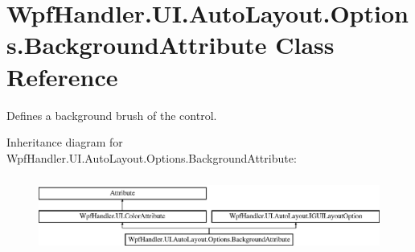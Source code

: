 \hypertarget{class_wpf_handler_1_1_u_i_1_1_auto_layout_1_1_options_1_1_background_attribute}{}\section{Wpf\+Handler.\+U\+I.\+Auto\+Layout.\+Options.\+Background\+Attribute Class Reference}
\label{class_wpf_handler_1_1_u_i_1_1_auto_layout_1_1_options_1_1_background_attribute}


Defines a background brush of the control.  


Inheritance diagram for Wpf\+Handler.\+U\+I.\+Auto\+Layout.\+Options.\+Background\+Attribute\+:\begin{figure}[H]
\begin{center}
\leavevmode
\includegraphics[height=2.500000cm]{d7/dde/class_wpf_handler_1_1_u_i_1_1_auto_layout_1_1_options_1_1_background_attribute}
\end{center}
\end{figure}
